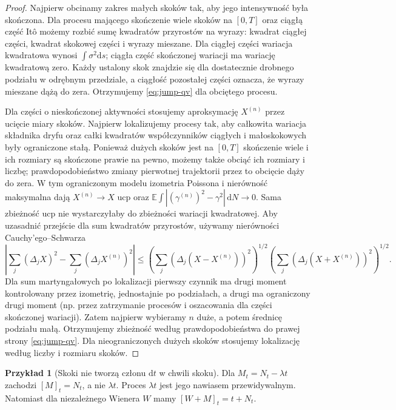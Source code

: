 \documentclass[11pt,a4paper,oneside]{report}
\numberwithin{equation}{chapter}
\theoremstyle{plain}
\theoremstyle{definition}
\newtheorem{przyklad}{Przykład}[chapter]
\theoremstyle{remark}
\newcommand{\E}{\mathbb{E}}
\newcommand{\dd}{\mathrm{d}}
\begin{document}
\begin{proof}
Najpierw obcinamy zakres małych skoków tak, aby jego
intensywność była skończona. Dla procesu mającego
skończenie wiele skoków na $[0,T]$ oraz ciągłą część
Itô możemy rozbić sumę kwadratów przyrostów na
wyrazy: kwadrat ciągłej części, kwadrat skokowej
części i wyrazy mieszane. Dla ciągłej części
wariacja kwadratowa wynosi $\int\sigma^2\dd s$;
ciągła część skończonej wariacji ma wariację kwadratową
zero. Każdy ustalony skok znajdzie się dla dostatecznie
drobnego podziału w odrębnym przedziale, a ciągłość
pozostałej części oznacza, że wyrazy mieszane dążą do
zera. Otrzymujemy \eqref{eq:jump-qv} dla obciętego procesu.

Dla części o nieskończonej aktywności stosujemy
aproksymację $X^{(n)}$ przez ucięcie miary skoków.
Najpierw lokalizujemy procesy tak, aby całkowita wariacja
składnika dryfu oraz całki kwadratów współczynników
ciągłych i małoskokowych były ograniczone stałą. Ponieważ
dużych skoków jest na $[0,T]$ skończenie wiele i ich rozmiary
są skończone prawie na pewno, możemy także obciąć ich
rozmiary i liczbę; prawdopodobieństwo zmiany pierwotnej
trajektorii przez to obcięcie dąży do zera. W tym
ograniczonym modelu izometria Poissona i nierówność maksymalna
dają $X^{(n)}\to X$ ucp oraz
$\E\int\!|(\gamma^{(n)})^2-\gamma^2|\,\dd N\to0$.
Sama zbieżność ucp nie wystarczyłaby do zbieżności wariacji
kwadratowej. Aby uzasadnić przejście dla sum kwadratów
przyrostów, używamy nierówności Cauchy'ego--Schwarza
\[
\left|\sum_j(\Delta_jX)^2-\sum_j(\Delta_jX^{(n)})^2\right|
\le\left(\sum_j(\Delta_j(X-X^{(n)}))^2\right)^{1/2}
\left(\sum_j(\Delta_j(X+X^{(n)}))^2\right)^{1/2}.
\]
Dla sum martyngałowych po lokalizacji pierwszy czynnik
ma drugi moment kontrolowany przez izometrię, jednostajnie
po podziałach, a drugi ma ograniczony drugi moment
(np. przez zatrzymanie procesów i oszacowania dla części
skończonej wariacji). Zatem najpierw wybieramy $n$ duże,
a potem średnicę podziału małą. Otrzymujemy zbieżność
według prawdopodobieństwa do prawej strony
\eqref{eq:jump-qv}. Dla nieograniczonych dużych skoków
stosujemy lokalizację według liczby i rozmiaru skoków.
\end{proof}

\begin{przyklad}[Skoki nie tworzą członu $\dd t$ w chwili skoku]
Dla $M_t=N_t-\lambda t$ zachodzi $[M]_t=N_t$,
a nie $\lambda t$. Proces $\lambda t$ jest jego nawiasem
przewidywalnym. Natomiast dla niezależnego Wienera
$W$ mamy $[W+M]_t=t+N_t$.
\end{przyklad}
\end{document}

